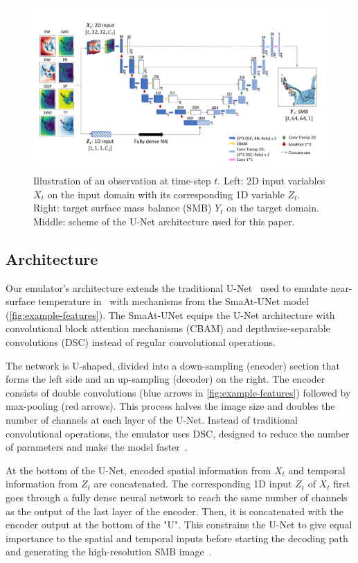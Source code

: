 \documentclass[a4paper,11pt,oneside]{report}
\begin{document}
\begin{figure}[!t]
  \centering
  \includegraphics[width=\columnwidth]{doc/Thesis-latex/images/unet-with-data.pdf}
  \caption []{\small Illustration of an observation at time-step $t$. Left: 2D input variables $X_t$ on the input domain with its corresponding 1D variable $Z_t$. Right: target surface mass balance (SMB) $Y_t$ on the target domain. Middle: scheme of the U-Net architecture used for this paper.}
  \vspace{-3mm}
  \label{fig:example-features}
\end{figure}

\subsection{Architecture}\label{subsec:architecture}
Our emulator's architecture extends the traditional U-Net~\cite{unet} used to emulate near-surface temperature in~\cite{Doury} with mechanisms from the SmaAt-UNet model~\cite{smatunet} (\autoref{fig:example-features}). The SmaAt-UNet equips the U-Net architecture with convolutional block attention mechanisms (CBAM) and depthwise-separable convolutions (DSC) instead of regular convolutional operations.

The network is U-shaped, divided into a down-sampling (encoder) section that forms the left side and an up-sampling (decoder) on the right. The encoder consists of double convolutions (blue arrows in \autoref{fig:example-features}) followed by max-pooling (red arrows). This process halves the image size and doubles the number of channels at each layer of the U-Net. Instead of traditional convolutional operations, the emulator uses DSC, designed to reduce the number of parameters and make the model faster~\cite{smatunet}. 

At the bottom of the U-Net, encoded spatial information from $X_t$ and temporal information from $Z_t$ are concatenated. The corresponding 1D input $Z_t$ of $X_t$ first goes through a fully dense neural network to reach the same number of channels as the output of the last layer of the encoder. Then, it is concatenated with the encoder output at the bottom of the "U". This constrains the U-Net to give equal importance to the spatial and temporal inputs before starting the decoding path and generating the high-resolution SMB image~\cite{Doury}. 
\end{document}
